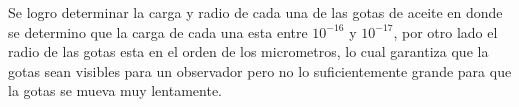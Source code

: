 Se logro determinar la carga y radio de cada una de las gotas de aceite en donde se determino que la carga de cada una esta entre $10^{-16}$ y $10^{-17}$, por otro lado el radio de las gotas esta en el orden de los micrometros, lo cual garantiza que la gotas sean visibles para un observador pero no lo suficientemente grande para que la gotas se mueva muy lentamente. 
